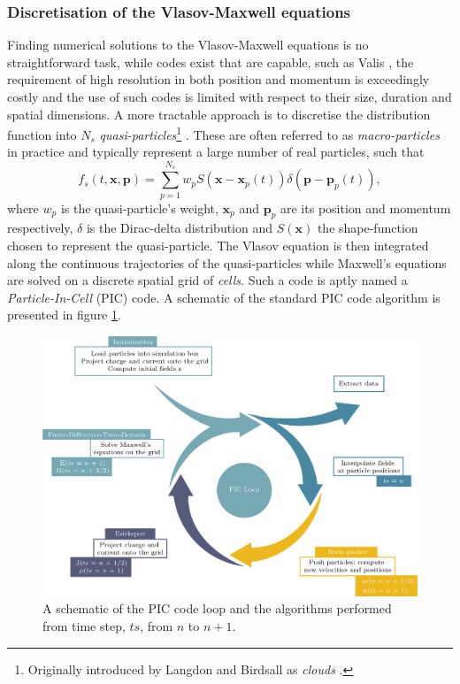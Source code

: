 \subsubsection{Discretisation of the Vlasov-Maxwell equations}
Finding numerical solutions to the Vlasov-Maxwell equations is no straightforward task, while codes exist that are capable, such as Valis \cite{sircombeVALISSplitconservativeScheme2009}, the requirement of high resolution in both position and momentum is exceedingly costly and the use of such codes is limited with respect to their size, duration and spatial dimensions. A more tractable approach is to discretise the distribution function into $N_s$ \textit{quasi-particles}\footnote{Originally introduced by Langdon and Birdsall as \textit{clouds} \cite{langdonTheoryPlasmaSimulation1970}.} . These are often referred to as \textit{macro-particles} in practice and typically represent a large number of real particles, such that
\begin{equation}
	f_s(t,\mathbf{x},\mathbf{p}) = \sum^{N_s}_{p=1} w_p S(\mathbf{x}-\mathbf{x}_p(t))\delta (\mathbf{p}-\mathbf{p}_p(t)),
\end{equation}
where $w_p$ is the quasi-particle's weight, $\mathbf{x}_p$ and $\mathbf{p}_p$ are its position and momentum respectively, $\delta$ is the Dirac-delta distribution and $S(\mathbf{x})$ the shape-function chosen to represent the quasi-particle. The Vlasov equation is then integrated along the continuous trajectories of the quasi-particles while Maxwell's equations are solved on a discrete spatial grid of \textit{cells}. Such a code is aptly named a\textit{ Particle-In-Cell} (PIC) code. A schematic of the standard PIC code algorithm is presented in figure \ref{fig:intropiccycle-01}. 
\begin{figure}
	\centering
	\includegraphics[width=\linewidth]{figures/intro/intro_PIC_cycle}
	\caption[A schematic of the PIC code loop and the algorithms performed.]{A schematic of the PIC code loop and the algorithms performed from time step, $ts$, from $n$ to $n+1$.}
	\label{fig:intropiccycle-01}
\end{figure}
